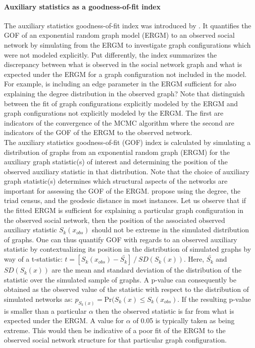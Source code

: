 \documentclass[a4paper, man]{apa6}
\begin{document}
\paragraph{Auxiliary statistics as a goodness-of-fit index}
The auxiliary statistics goodness-of-fit index was introduced by . It quantifies the GOF of an exponential random graph model (ERGM) to an observed social network by simulating from the ERGM to investigate graph configurations which were not modeled explicitly. Put differently, the index summarizes the discrepancy between what is observed in the social network graph and what is expected under the ERGM for a graph configuration not included in the model. For example, is including an edge parameter in the ERGM sufficient for also explaining the degree distribution in the observed graph? Note that  distinguish between the fit of graph configurations explicitly modeled by the ERGM and graph configurations not explicitly modeled by the ERGM. The first are indicators of the convergence of the MCMC algorithm where the second are indicators of the GOF of the ERGM to the observed network.  
\\
The auxiliary statistics goodness-of-fit (GOF) index is calculated by simulating a distribution of graphs from an exponential random graph (ERGM) for the auxiliary graph statistic(s) of interest and determining the position of the observed auxiliary statistic in that distribution. Note that the choice of auxiliary graph statistic(s) determines which structural aspects of the networks are important for assessing the GOF of the ERGM.  propose using the degree, the triad census, and the geodesic distance in most instances. Let us observe that if the fitted ERGM is sufficient for explaining a particular graph configuration in the observed social network, then the position of the associated observed auxiliary statistic $S_{k}(x_{obs})$ should not be extreme in the simulated distribution of graphs. \clearpage \noindent One can thus quantify GOF with regards to an observed auxiliary statistic by contextualizing its position in the distribution of simulated graphs by way of a t-statistic: $t = [S_{k}(x_{obs}) − \bar{S_{k}}] \ / \ SD(S_{k}(x))$. Here, $\bar{S_{k}}$ and $SD(S_{k}(x))$ are the mean and standard deviation of the distribution of the statistic over the simulated sample of graphs. A p-value can consequently be obtained as the observed value of the statistic with respect to the distribution of simulated networks as: $p_{S_{k}(x)} = \text{Pr}(S_{k}(x) \leq S_{k}(x_{obs})$. If the resulting p-value is smaller than a particular $\alpha$ then the observed statistic is far from what is expected under the ERGM. A value for $\alpha$ of 0.05 is typically taken as being extreme. This would then be indicative of a poor fit of the ERGM to the observed social network structure for that particular graph configuration. 
\\
\end{document}
